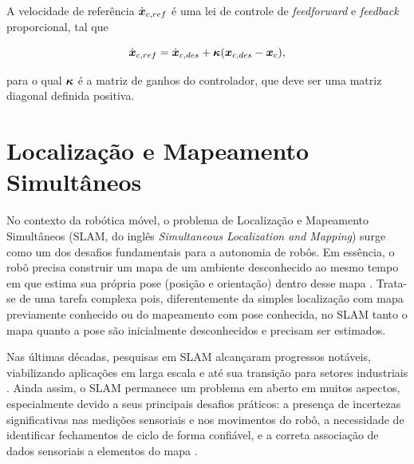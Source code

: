     A velocidade de referência \( \dot{\boldsymbol{x}}_{c,ref} \) é uma lei de controle de \textit{feedforward} e \textit{feedback} proporcional, tal que
    
    \begin{equation}
        \dot{\boldsymbol{x}}_{c,ref} = \dot{\boldsymbol{x}}_{c,des} + \boldsymbol{\kappa}(\boldsymbol{x}_{c,des} - \boldsymbol{x}_c),
        \label{eq:ff_fb_law}
    \end{equation}
    
    \noindent para o qual \( \boldsymbol{\kappa} \) é a matriz de ganhos do controlador, que deve ser uma matriz diagonal definida positiva.


    

\section{Localização e Mapeamento Simultâneos}

No contexto da robótica móvel, o problema de Localização e Mapeamento Simultâneos (SLAM, do inglês \textit{Simultaneous Localization and Mapping}) surge como um dos desafios fundamentais para a autonomia de robôs. Em essência, o robô precisa construir um mapa de um ambiente desconhecido ao mesmo tempo em que estima sua própria pose (posição e orientação) dentro desse mapa \cite{Thrun2005}. Trata-se de uma tarefa complexa pois, diferentemente da simples localização com mapa previamente conhecido ou do mapeamento com pose conhecida, no SLAM tanto o mapa quanto a pose são inicialmente desconhecidos e precisam ser estimados\cite{Thrun2005}. 

Nas últimas décadas, pesquisas em SLAM alcançaram progressos notáveis, viabilizando aplicações em larga escala e até sua transição para setores industriais \cite{Yue2024} \cite{Cadena2016}. Ainda assim, o SLAM permanece um problema em aberto em muitos aspectos, especialmente devido a seus principais desafios práticos: a presença de incertezas significativas nas medições sensoriais e nos movimentos do robô, a necessidade de identificar fechamentos de ciclo de forma confiável, e a correta associação de dados sensoriais a elementos do mapa \cite{Yue2024} \cite{Placed2023AFrontiers} \cite{Bavle2023FromSurvey}.

